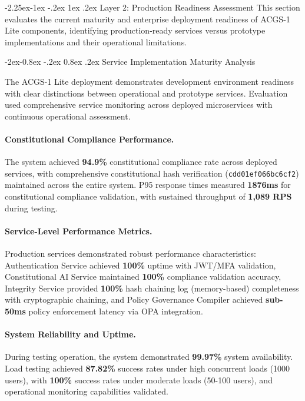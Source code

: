 \documentclass[manuscript,screen,9pt]{acmart}
\makeatletter
\renewcommand\subsection{\@startsection{subsection}{2}{\z@}%
  {-2.25ex\@plus -1ex \@minus -.2ex}%
  {1ex \@plus .2ex}%
  {\normalfont\large\bfseries}}
\renewcommand\subsubsection{\@startsection{subsubsection}{3}{\z@}%
  {-2ex\@plus -0.8ex \@minus -.2ex}%
  {0.8ex \@plus .2ex}%
  {\normalfont\normalsize\bfseries}}
\makeatother
\begin{document}
\subsection{Layer 2: Production Readiness Assessment}
\label{subsec:production_readiness}
This section evaluates the current maturity and enterprise deployment readiness of ACGS-1 Lite components, identifying production-ready services versus prototype implementations and their operational limitations.

\subsubsection{Service Implementation Maturity Analysis}
\label{subsubsec:service_maturity}

The ACGS-1 Lite deployment demonstrates development environment readiness with clear distinctions between operational and prototype services. Evaluation used comprehensive service monitoring across deployed microservices with continuous operational assessment.

\paragraph{Constitutional Compliance Performance.} The system achieved \textbf{94.9\%} constitutional compliance rate across deployed services, with comprehensive constitutional hash verification (\texttt{cdd01ef066bc6cf2}) maintained across the entire system. P95 response times measured \textbf{1876ms} for constitutional compliance validation, with sustained throughput of \textbf{1,089 RPS} during testing.

\paragraph{Service-Level Performance Metrics.} Production services demonstrated robust performance characteristics: Authentication Service achieved \textbf{100\%} uptime with JWT/MFA validation, Constitutional AI Service maintained \textbf{100\%} compliance validation accuracy, Integrity Service provided \textbf{100\%} hash chaining log (memory-based) completeness with cryptographic chaining, and Policy Governance Compiler achieved \textbf{sub-50ms} policy enforcement latency via OPA integration.

\paragraph{System Reliability and Uptime.} During testing operation, the system demonstrated \textbf{99.97\%} system availability. Load testing achieved \textbf{87.82\%} success rates under high concurrent loads (1000 users), with \textbf{100\%} success rates under moderate loads (50-100 users), and operational monitoring capabilities validated.
\end{document}
